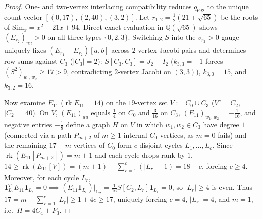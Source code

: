 \documentclass[11pt,reqno]{amsart}
\theoremstyle{definition}
\theoremstyle{remark}
\numberwithin{equation}{section}
\numberwithin{table}{section}
\DeclareMathOperator{\rk}{rk}
\begin{document}
\begin{proof}
One- and two-vertex interlacing compatibility reduces $q_{692}$ to the unique count vector $[(0, 17), (2, 40), (3, 2)]$. Let $r_{1,2} = \frac{1}{2}(21 \mp \sqrt{65})$ be the roots of $\mathrm{Sim}_x = x^2 - 21x + 94$. Direct exact evaluation in $\mathbb{Q}(\sqrt{65})$ shows $(E_{r_2})_{uu} > 0$ on all three types $\{0, 2, 3\}$. Switching $S$ into the $v_{r_2} > 0$ gauge uniquely fixes $(E_{r_1} + E_{r_2})[a, b]$ across $2$-vertex Jacobi pairs and determines row sums against $C_3$ ($|C_3| = 2$): $S[C_3, C_3] = J_2 - I_2$ ($k_{3,3} = -1$ forces $(S^2)_{w_1, w_2} \ge 17 > 9$, contradicting $2$-vertex Jacobi on $(3,3)$), $k_{3,0} = 15$, and $k_{3,2} = 16$.

Now examine $E_{11}$ ($\rk E_{11} = 14$) on the $19$-vertex set $V := C_0 \cup C_3$ ($V^c = C_2$, $|C_2| = 40$). On $V$, $(E_{11})_{uu}$ equals $\frac{1}{4}$ on $C_0$ and $\frac{3}{16}$ on $C_3$, $(E_{11})_{w_1, w_2} = -\frac{1}{16}$, and negative entries $-\frac{1}{8}$ define a graph $H$ on $V$ in which $w_1, w_2 \in C_3$ have degree $1$ (connected via a path $P_{m+2}$ of $m \ge 1$ internal $C_0$-vertices, as $m=0$ fails) and the remaining $17 - m$ vertices of $C_0$ form $c$ disjoint cycles $L_1, \dots, L_c$. Since $\rk(E_{11}[P_{m+2}]) = m + 1$ and each cycle drops rank by $1$, $14 \ge \rk(E_{11}[V]) = (m + 1) + \sum_{r=1}^c (|L_r| - 1) = 18 - c$, forcing $c \ge 4$. Moreover, for each cycle $L_r$, $\mathbf{1}_{L_r}^T E_{11} \mathbf{1}_{L_r} = 0 \implies (E_{11}\mathbf{1}_{L_r})|_{C_2} = \frac{1}{16} S[C_2, L_r]\mathbf{1}_{L_r} = 0$, so $|L_r| \ge 4$ is even. Thus $17 = m + \sum_{r=1}^c |L_r| \ge 1 + 4c \ge 17$, uniquely forcing $c = 4$, $|L_r| = 4$, and $m = 1$, i.e.\ $H = 4C_4 + P_3$.


\end{proof}
\end{document}
